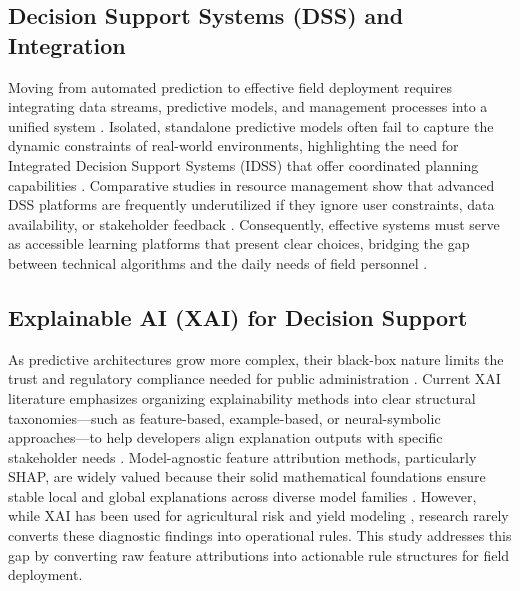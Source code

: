 \documentclass[fleqn,10pt,lineno]{wlpeerj}
\begin{document}
\subsection{Decision Support Systems (DSS) and Integration}
Moving from automated prediction to effective field deployment requires integrating data streams, predictive models, and management processes into a unified system \citep{liu2009}. Isolated, standalone predictive models often fail to capture the dynamic constraints of real-world environments, highlighting the need for Integrated Decision Support Systems (IDSS) that offer coordinated planning capabilities \citep{liu2009}. Comparative studies in resource management show that advanced DSS platforms are frequently underutilized if they ignore user constraints, data availability, or stakeholder feedback \citep{volk2010}. Consequently, effective systems must serve as accessible learning platforms that present clear choices, bridging the gap between technical algorithms and the daily needs of field personnel \citep{volk2010}.

\subsection{Explainable AI (XAI) for Decision Support}
As predictive architectures grow more complex, their black-box nature limits the trust and regulatory compliance needed for public administration \citep{hassija2024}. Current XAI literature emphasizes organizing explainability methods into clear structural taxonomies—such as feature-based, example-based, or neural-symbolic approaches—to help developers align explanation outputs with specific stakeholder needs \citep{speith2022, dwivedi2023}. Model-agnostic feature attribution methods, particularly SHAP, are widely valued because their solid mathematical foundations ensure stable local and global explanations across diverse model families \citep{lundberg2017, lundberg2020, yu2026, guidotti2019}. However, while XAI has been used for agricultural risk and yield modeling \citep{ghosal2018, ryo2022}, research rarely converts these diagnostic findings into operational rules. This study addresses this gap by converting raw feature attributions into actionable rule structures for field deployment.
\end{document}

